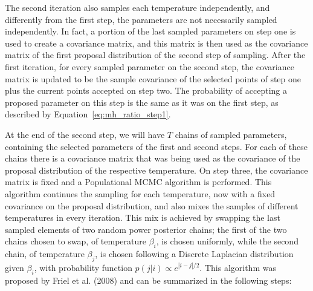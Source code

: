 The second iteration also samples each temperature independently, and
differently from the first step, the parameters are not necessarily 
sampled independently. In fact, a portion of the last sampled parameters
on step one is used to create a covariance matrix, and this matrix is
then used as the covariance matrix of the first proposal distribution of 
the second step of sampling. After the first iteration, for every 
sampled parameter on the second step, the covariance matrix is updated 
to be the sample covariance of the selected points of step one plus the  
current points accepted on step two. The probability of accepting a 
proposed parameter on this step is the same  as it was on the first 
step, as described by Equation~\ref{eq:mh_ratio_step1}.

At the end of the second step, we will have $T$ chains of sampled 
parameters, containing the selected parameters of the first and second 
steps. For each of these chains there is a covariance matrix that was
being used as the covariance of the proposal distribution of the 
respective temperature. On step three, the covariance matrix is fixed 
and a Populational MCMC algorithm is performed. This algorithm continues 
the sampling for each temperature, now with a fixed covariance on the 
proposal distribution, and also mixes the samples of different 
temperatures in every iteration. This mix is achieved by swapping the 
last sampled elements of two random power posterior chains; the first of
the two chains chosen to swap, of temperature $\beta_i$, is chosen 
uniformly, while the second chain, of temperature $\beta_j$, is chosen 
following a Discrete Laplacian distribution given $\beta_i$, with 
probability function $p (j | i) \propto e^{|i - j| / 2}$. This algorithm 
was proposed by Friel et al. (2008) and can be summarized in the 
following steps:
